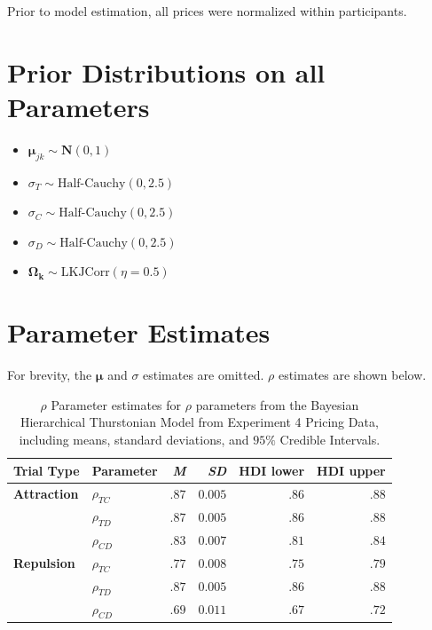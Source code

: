 Prior to model estimation, all prices were normalized within participants. 

\section{Prior Distributions on all Parameters}

\begin{itemize}
    \item $\boldsymbol{\mu}_{jk} \sim \mathcal{\textbf{N}}(0,1)$
    \item $\sigma_{T} \sim \text{Half-Cauchy}(0,2.5)$
    \item $\sigma_{C} \sim \text{Half-Cauchy}(0,2.5)$
    \item $\sigma_{D} \sim \text{Half-Cauchy}(0,2.5)$
    \item $\boldsymbol{\Omega_{k}} \sim \text{LKJCorr}(\eta=0.5)$
\end{itemize}

\section{Parameter Estimates}

For brevity, the $\boldsymbol{\mu}$ and $\sigma$ estimates are omitted. $\rho$ estimates are shown below.
\begin{table}[ht]
    \centering
    \begin{tabular}{llrrrr}
        \toprule
        Trial Type & Parameter & \textit{M} & \textit{SD} & HDI lower & HDI upper \\
        \midrule
        \textbf{Attraction}  &  $\rho_{TC}$     &    $.87$   &   $0.005$    &  $.86$     & $.88$     \\
                             &  $\rho_{TD}$    &     $.87$   &   $0.005$    &  $.86$     & $.88$     \\
                             &  $\rho_{CD}$    &     $.83$   &   $0.007$    &  $.81$     & $.84$     \\
        \textbf{Repulsion}   &  $\rho_{TC}$     &    $.77$   &   $0.008$    &  $.75$     & $.79$     \\
                             &  $\rho_{TD}$    &     $.87$   &   $0.005$    &  $.86$     & $.88$     \\
                             &  $\rho_{CD}$    &     $.69$   &   $0.011$     &  $.67$     & $.72$     \\
        \bottomrule
    \end{tabular}
    \caption{$\rho$ Parameter estimates for $\rho$ parameters from the Bayesian Hierarchical Thurstonian Model from Experiment 4 Pricing Data, including means, standard deviations, and $95\%$ Credible Intervals.}
    \label{tab:e4_rho_params}
\end{table}

